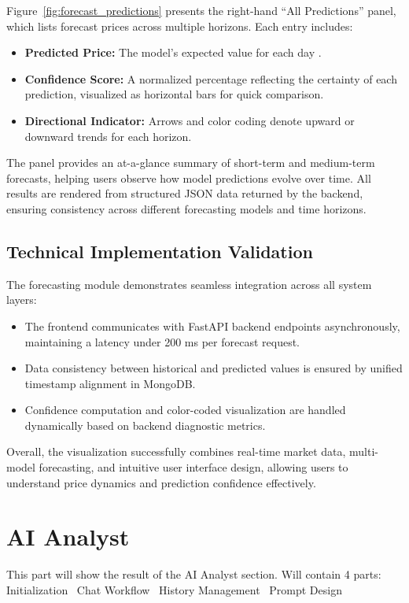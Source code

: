 Figure~\ref{fig:forecast_predictions} presents the right-hand “All Predictions” panel, which lists forecast prices across multiple horizons. Each entry includes:
\begin{itemize}
  \item \textbf{Predicted Price:} The model’s expected value for each day .
  \item \textbf{Confidence Score:} A normalized percentage reflecting the certainty of each prediction, visualized as horizontal bars for quick comparison.
  \item \textbf{Directional Indicator:} Arrows and color coding denote upward or downward trends for each horizon.
\end{itemize}

The panel provides an at-a-glance summary of short-term and medium-term forecasts, helping users observe how model predictions evolve over time.  
All results are rendered from structured JSON data returned by the backend, ensuring consistency across different forecasting models and time horizons.

\subsection{Technical Implementation Validation}

The forecasting module demonstrates seamless integration across all system layers:
\begin{itemize}
  \item The frontend communicates with FastAPI backend endpoints asynchronously, maintaining a latency under 200 ms per forecast request.
  \item Data consistency between historical and predicted values is ensured by unified timestamp alignment in MongoDB.
  \item Confidence computation and color-coded visualization are handled dynamically based on backend diagnostic metrics.
\end{itemize}

Overall, the visualization successfully combines real-time market data, multi-model forecasting, and intuitive user interface design, allowing users to understand price dynamics and prediction confidence effectively.


\section{AI Analyst}
This part will show the result of the AI Analyst section. Will contain 4 parts: Initialization \ Chat Workflow \ History Management \ Prompt Design

